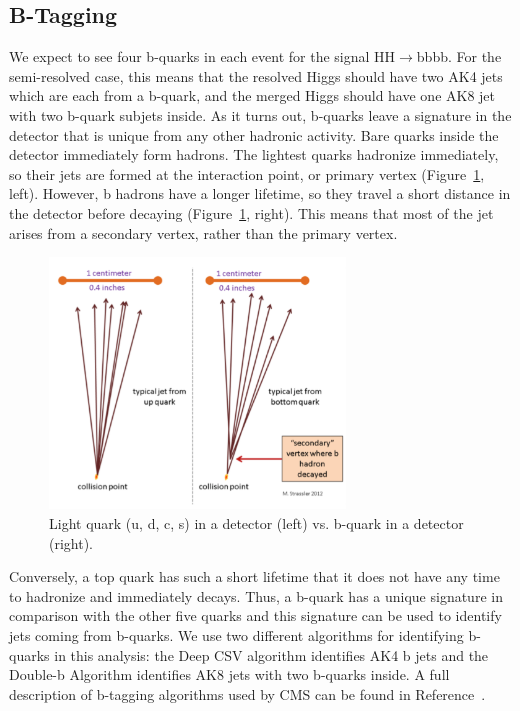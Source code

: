 \subsection{B-Tagging}
We expect to see four b-quarks in each event for the signal HH$\rightarrow$bbbb. For the semi-resolved case, this means that the resolved Higgs should have two AK4 jets which are each from a b-quark, and the merged Higgs should have one AK8 jet with two b-quark subjets inside. As it turns out, b-quarks leave a signature in the detector that is unique from any other hadronic activity. Bare quarks inside the detector immediately form hadrons. The lightest quarks hadronize immediately, so their jets are formed at the interaction point, or primary vertex (Figure~\ref{Fig:bjet}, left). However, b hadrons have a longer lifetime, so they travel a short distance in the detector before decaying (Figure~\ref{Fig:bjet}, right). This means that most of the jet arises from a secondary vertex, rather than the primary vertex. 
\begin{figure}[h!]
    \centering
        \includegraphics[width=0.7\textwidth]{F4/bquark.png}
        \caption{Light quark (u, d, c, s) in a detector (left) vs. b-quark in a detector (right).}
        \label{Fig:bjet}
\end{figure}
Conversely, a top quark has such a short lifetime that it does not have any time to hadronize and immediately decays. Thus, a b-quark has a unique signature in comparison with the other five quarks and this signature can be used to identify jets coming from b-quarks. We use two different algorithms for identifying b-quarks in this analysis: the Deep CSV algorithm identifies AK4 b jets and the Double-b Algorithm identifies AK8 jets with two b-quarks inside. A full description of b-tagging algorithms used by CMS can be found in Reference~\cite{Sirunyan:2017ezt}.

